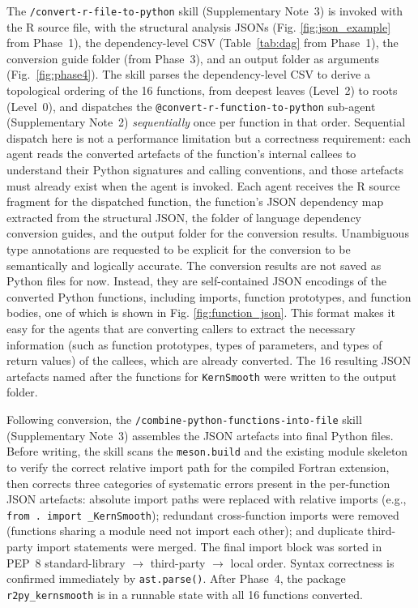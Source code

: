 \documentclass[12pt,a4paper]{article}
\makeatletter
\newcommand{\skill}[1]{\texttt{/#1}}
\newcommand{\agent}[1]{\texttt{@#1}}
\newcommand{\pkg}[1]{\texttt{#1}}
\newcommand{\suppnote}[1]{Supplementary Note~#1}
\makeatother
\begin{document}
The \skill{convert-r-file-to-python} skill (\suppnote{3}) is invoked with the R source file, with the structural analysis JSONs (Fig. \ref{fig:json_example} from Phase~1), the dependency-level CSV (Table~\ref{tab:dag} from Phase~1), the conversion guide folder (from Phase~3), and an output folder as arguments (Fig.~\ref{fig:phase4}). The skill parses the dependency-level CSV to derive a topological ordering of the 16 functions, from deepest leaves (Level~2) to roots (Level~0), and dispatches the \agent{convert-r-function-to-python} sub-agent (\suppnote{2}) \textit{sequentially} once per function in that order. Sequential dispatch here is not a performance limitation but a correctness requirement: each agent reads the converted artefacts of the function's internal callees to understand their Python signatures and calling conventions, and those artefacts must already exist when the agent is invoked. Each agent receives the R source fragment for the dispatched function, the function's JSON dependency map extracted from the structural JSON, the folder of language dependency conversion guides, and the output folder for the conversion results. Unambiguous type annotations are requested to be explicit for the conversion to be semantically and logically accurate. The conversion results are not saved as Python files for now. Instead, they are self-contained JSON encodings of the converted Python functions, including imports, function prototypes, and function bodies, one of which is shown in Fig. \ref{fig:function_json}. This format makes it easy for the agents that are converting callers to extract the necessary information (such as function prototypes, types of parameters, and types of return values) of the callees, which are already converted. The 16 resulting JSON artefacts named after the functions for \pkg{KernSmooth} were written to the output folder.

Following conversion, the \skill{combine-python-functions-into-file} skill (\suppnote{3}) assembles the JSON artefacts into final Python files. Before writing, the skill scans the \texttt{meson.build} and the existing module skeleton to verify the correct relative import path for the compiled Fortran extension, then corrects three categories of systematic errors present in the per-function JSON artefacts: absolute import paths were replaced with relative imports (e.g., \texttt{from~.~import~\_KernSmooth}); redundant cross-function imports were removed (functions sharing a module need not import each other); and duplicate third-party import statements were merged. The final import block was sorted in PEP~8 standard-library $\to$ third-party $\to$ local order. Syntax correctness is confirmed immediately by \texttt{ast.parse()}. After Phase~4, the package \pkg{r2py\_kernsmooth} is in a runnable state with all 16 functions converted.
\end{document}
